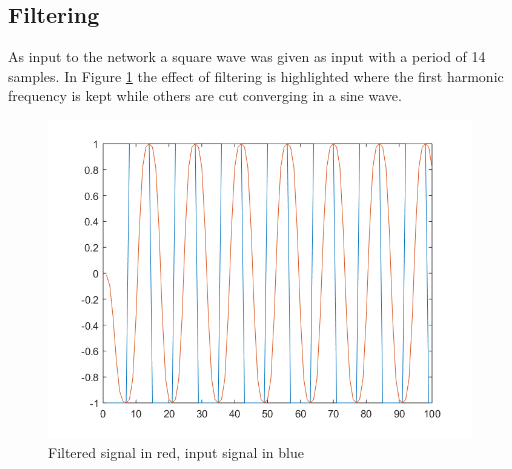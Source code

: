 \subsection{Filtering}
As input to the network a square wave was given as input with a period of 14 samples. In Figure \ref{fig:filt} the effect of filtering is highlighted where the first harmonic frequency is kept while others are cut converging in a sine wave.
\begin{figure}[H]
  \centering
  \includegraphics[width=0.9\linewidth]{./images/filtered}
  \caption{Filtered signal in red, input signal in blue}
  \label{fig:filt}
\end{figure}